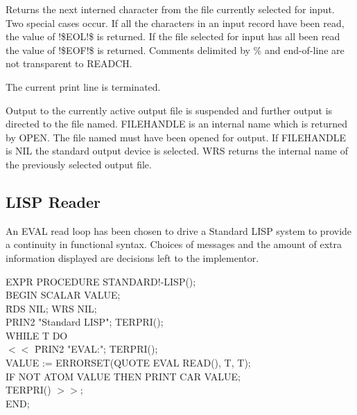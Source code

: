 \documentclass[11pt,letterpaper]{book}
\begin{document}
{Returns the next interned character from the file currently selected
for input. Two special cases occur. If all the characters in an input
  record have been read,
the value of !\$EOL!\$ is returned. If the file selected for input has
all been read the value of !\$EOF!\$ is returned. Comments delimited
by \% and end-of-line are not transparent to READCH.  }


{The current print line is terminated.}


{Output to the currently active output file is suspended and further
output is directed to the file named. FILEHANDLE is an internal name
which is returned by OPEN. The file named must have been opened for
output. If FILEHANDLE is NIL the standard output device is selected.
 
WRS returns the internal name of the previously selected output file.

}

\subsection{LISP Reader}

An EVAL read loop has been chosen to drive a Standard LISP system to
provide a continuity in functional syntax. Choices of messages and the
amount of extra information displayed are decisions left to the
implementor.

{\tt \begin{tabbing} EXPR PROCEDURE STANDARD!-LISP(); \\ BEGIN SCALAR
VALUE; \\
\hspace*{2em} \= RDS NIL;  WRS NIL; \\
\> PRIN2 "Standard LISP"; TERPRI(); \\
\> WHILE T DO \\
\> \hspace*{1em} $<<$ \= PRIN2 "EVAL:"; TERPRI(); \\
\> \> VALUE := ERRORSET(QUOTE EVAL READ(), T, T); \\
\> \> IF NOT ATOM VALUE THEN PRINT CAR VALUE; \\
\> \> TERPRI() $>>$; \\
END;
\end{tabbing}}
\end{document}
